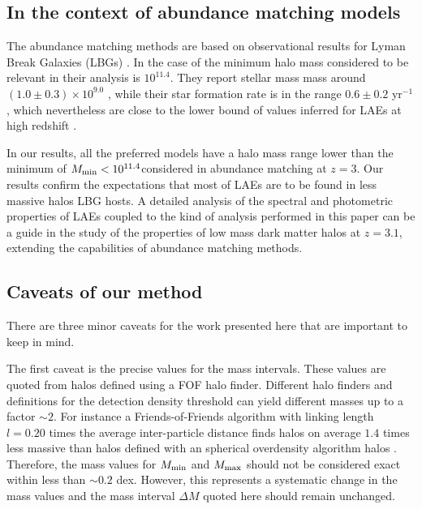 \documentclass{emulateapj}
\newcommand{\hMsun}{{\ifmmode{h^{-1}{\rm
        {M_{\odot}}}}\else{$h^{-1}{\rm{M_{\odot}}}$}\fi}}
\newcommand{\Msun}{{\ifmmode{{\rm {M_{\odot}}}}\else{${\rm{M_{\odot}}}$}\fi}}
\begin{document}
\subsection{In the context of abundance matching models}

The abundance matching methods are based on observational results for
Lyman Break Galaxies (LBGs) \citep{Behroozi2013a,Behroozi2013b}.  In
the case of \cite{Behroozi2013a} the minimum halo mass considered to
be relevant in their analysis is $10^{11.4}$\hMsun. They report
stellar mass mass around $(1.0\pm0.3)\times 10^{9.0}$ \hMsun, while
their star formation rate is in the range $0.6\pm 0.2$ \Msun yr$^{-1}$,
which nevertheless are close to the lower bound of values inferred for
LAEs at high redshift \citep{Gawiser2007,Nilsson2009,Pentericci2009}. 

In our results, all the preferred models have a halo mass range lower
than the minimum of $M_{\rm min}<10^{11.4}$\hMsun considered in
abundance matching at $z=3$. Our results confirm the expectations
that most of  LAEs are to be found in less massive halos LBG hosts. A
detailed analysis of the spectral and photometric properties of LAEs
coupled to the kind of analysis performed in this paper can be a guide
in the study of the properties of low mass dark matter halos at
$z=3.1$, extending the capabilities of abundance matching methods.

\subsection{Caveats of our method}

There are three minor caveats for the work presented here that are important
to keep in mind. 

The first caveat is the precise values for the mass intervals. These
values are quoted from halos defined using a FOF halo
finder. Different halo finders and definitions for the detection
density threshold can yield different masses up to a factor $\sim 2$\citep{More2011}. For 
instance a Friends-of-Friends algorithm with linking length $l=0.20$
times the average inter-particle distance finds halos on average $1.4$
times less massive than halos defined  with an spherical overdensity
algorithm halos \citep{Bolshoi}. Therefore, the mass values for
$M_{\rm min}$ and $M_{\rm max}$ should not be considered exact within
less than $\sim 0.2$ dex. However, this represents a systematic change
in the mass values and the mass interval $\Delta M$ quoted here should
remain unchanged.
\end{document}
